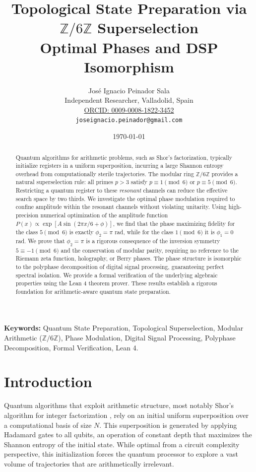 \documentclass[12pt,a4paper]{article}
\title{\textbf{Topological State Preparation via \(\mathbb{Z}/6\mathbb{Z}\) Superselection}\\[0.5em]
\large Optimal Phases and DSP Isomorphism}
\author{José Ignacio Peinador Sala\\
\small Independent Researcher, Valladolid, Spain\\
\small \href{https://orcid.org/0009-0008-1822-3452}{ORCID: 0009-0008-1822-3452}\\
\small \texttt{joseignacio.peinador@gmail.com}}
\date{\today}
\theoremstyle{plain}
\theoremstyle{definition}
\theoremstyle{remark}
\begin{document}
\maketitle

\begin{abstract}
Quantum algorithms for arithmetic problems, such as Shor's factorization, typically initialize registers in a uniform superposition, incurring a large Shannon entropy overhead from computationally sterile trajectories. The modular ring \(\mathbb{Z}/6\mathbb{Z}\) provides a natural superselection rule: all primes \(p>3\) satisfy \(p \equiv 1 \pmod{6}\) or \(p \equiv 5 \pmod{6}\). Restricting a quantum register to these \emph{resonant} channels can reduce the effective search space by two thirds. We investigate the optimal phase modulation required to confine amplitude within the resonant channels without violating unitarity. Using high-precision numerical optimization of the amplitude function \(P(x) \propto \exp[A\sin(2\pi x/6 + \phi)]\), we find that the phase maximizing fidelity for the class \(5 \pmod{6}\) is exactly \(\phi_2 = \pi\) rad, while for the class \(1 \pmod{6}\) it is \(\phi_1 = 0\) rad. We prove that \(\phi_2 = \pi\) is a rigorous consequence of the inversion symmetry \(5 \equiv -1 \pmod{6}\) and the conservation of modular parity, requiring no reference to the Riemann zeta function, holography, or Berry phases. The phase structure is isomorphic to the polyphase decomposition of digital signal processing, guaranteeing perfect spectral isolation. We provide a formal verification of the underlying algebraic properties using the Lean 4 theorem prover. These results establish a rigorous foundation for arithmetic-aware quantum state preparation.
\end{abstract}
\vspace{1em}
\noindent\textbf{Keywords:} Quantum State Preparation, Topological Superselection, Modular Arithmetic (\(\mathbb{Z}/6\mathbb{Z}\)), Phase Modulation, Digital Signal Processing, Polyphase Decomposition, Formal Verification, Lean 4.


\section{Introduction}
Quantum algorithms that exploit arithmetic structure, most notably Shor's algorithm for integer factorization \cite{Shor1994}, rely on an initial uniform superposition over a computational basis of size \(N\). This superposition is generated by applying Hadamard gates to all qubits, an operation of constant depth that maximizes the Shannon entropy of the initial state. While optimal from a circuit complexity perspective, this initialization forces the quantum processor to explore a vast volume of trajectories that are arithmetically irrelevant.
\end{document}
